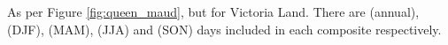 \label{fig:victoria}
As per Figure \ref{fig:queen_maud}, but for Victoria Land. There are (annual),  (DJF),  (MAM),  (JJA) and  (SON) days included in each composite respectively.